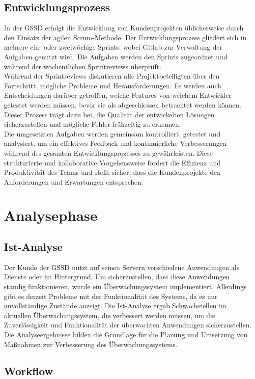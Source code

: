 \begin{flushleft}
\subsection{Entwicklungsprozess}
In der \acs{GSSD} erfolgt die Entwicklung von Kundenprojekten üblicherweise durch den Einsatz der agilen Scrum-Methode. Der Entwicklungsprozess gliedert sich in mehrere ein- oder zweiwöchige Sprints, wobei Gitlab zur Verwaltung der Aufgaben genutzt wird. Die Aufgaben werden den Sprints zugeordnet und während der wöchentlichen Sprintreviews überprüft.\\
Während der Sprintreviews diskutieren alle Projektbeteiligten über den Fortschritt, mögliche Probleme und Herausforderungen. Es werden auch Entscheidungen darüber getroffen, welche Features von welchem Entwickler getestet werden müssen, bevor sie als abgeschlossen betrachtet werden können. Dieser Prozess trägt dazu bei, die Qualität der entwickelten Lösungen sicherzustellen und mögliche Fehler frühzeitig zu erkennen.\\
Die umgesetzten Aufgaben werden gemeinsam kontrolliert, getestet und analysiert, um ein effektives Feedback und kontinuierliche Verbesserungen während des gesamten Entwicklungsprozesses zu gewährleisten. Diese strukturierte und kollaborative Vorgehensweise fördert die Effizienz und Produktivität des Teams und stellt sicher, dass die Kundenprojekte den Anforderungen und Erwartungen entsprechen.\\

\section{Analysephase}
\subsection{Ist-Analyse}
Der Kunde der \acs{GSSD} nutzt auf seinen Servern verschiedene Anwendungen als Dienste oder im Hintergrund.
Um sicherzustellen, dass diese Anwendungen ständig funktionieren, wurde ein Überwachungssystem implementiert.
Allerdings gibt es derzeit Probleme mit der Funktionalität des Systems, da es nur unvollständige Zustände anzeigt.
Die Ist-Analyse ergab Schwachstellen im aktuellen Überwachungssystem, die verbessert werden müssen, um die Zuverlässigkeit und Funktionalität der überwachten Anwendungen sicherzustellen.
Die Analyseergebnisse bilden die Grundlage für die Planung und Umsetzung von Maßnahmen zur Verbesserung des Überwachungssystems.

\subsection{Workflow}


\end{flushleft}
